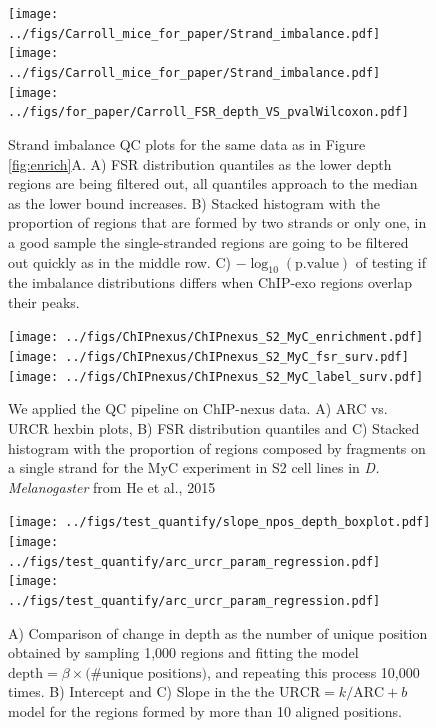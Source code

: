 \documentclass{bmcart}\usepackage[]{graphicx}\usepackage[]{color}
\begin{document}
\begin{figure}[h!]
  \centering  
  \texttt{[image: ../figs/Carroll\_mice\_for\_paper/Strand\_imbalance.pdf]} 
  \newline
  \texttt{[image: ../figs/Carroll\_mice\_for\_paper/Strand\_imbalance.pdf]} 
  \texttt{[image: ../figs/for\_paper/Carroll\_FSR\_depth\_VS\_pvalWilcoxon.pdf]}
  \caption{Strand imbalance QC plots for the same data as in Figure
    \ref{fig:enrich}A. A) FSR distribution quantiles as the lower
    depth regions are being filtered out, all quantiles approach to
    the median as the lower bound increases. B) Stacked histogram with
    the proportion of regions that are formed by two strands or only
    one, in a good sample the single-stranded regions are going to be
    filtered out quickly as in the middle row. C)
    $-\log_{10}(\text{p.value})$ of testing if the imbalance
    distributions differs when ChIP-exo regions overlap their peaks.}
  \label{fig:strand}
\end{figure}

\newpage

\begin{figure}[h!]
  \centering
  \texttt{[image: ../figs/ChIPnexus/ChIPnexus\_S2\_MyC\_enrichment.pdf]}
\newline
  \texttt{[image: ../figs/ChIPnexus/ChIPnexus\_S2\_MyC\_fsr\_surv.pdf]}  
  \texttt{[image: ../figs/ChIPnexus/ChIPnexus\_S2\_MyC\_label\_surv.pdf]}  
  \caption{We applied the QC pipeline on ChIP-nexus data. A) ARC
    vs. URCR hexbin plots, B) FSR distribution quantiles and C)
    Stacked histogram with the proportion of regions composed by
    fragments on a single strand for the MyC experiment in S2 cell
    lines in \emph{D. Melanogaster} from He et al., 2015
    \cite{chipnexus}}
  \label{fig:nexus}
\end{figure}

\newpage


\begin{figure}[h!]
  \centering
  \texttt{[image: ../figs/test\_quantify/slope\_npos\_depth\_boxplot.pdf]}
  \texttt{[image: ../figs/test\_quantify/arc\_urcr\_param\_regression.pdf]}
  \texttt{[image: ../figs/test\_quantify/arc\_urcr\_param\_regression.pdf]}
  \caption{A) Comparison of change in depth as the number of unique
    position obtained by sampling 1,000 regions and fitting
    the model $\mbox{depth} = \beta \times \text{(\# unique
      positions)}$, and repeating this process 10,000 times. B)
    Intercept and C) Slope in the the $\mbox{URCR} = k / \mbox{ARC} +
    b$ model for the regions formed by more than 10 aligned
    positions.}
  \label{fig:enrich_all}
\end{figure}
\end{document}
